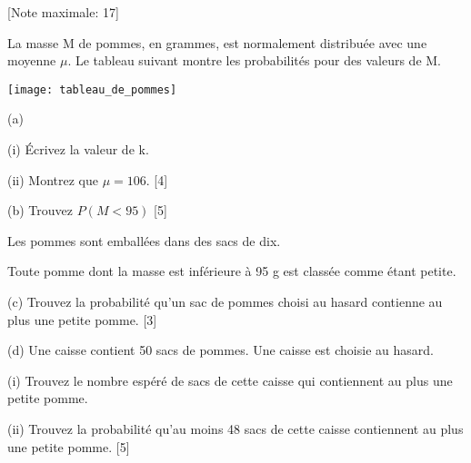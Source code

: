 \begin{question}
  \hspace*{\fill} [Note maximale: 17]\par
  \noindent La masse M de pommes, en grammes, est normalement distribuée avec une moyenne $\mu$. Le
  tableau suivant montre les probabilités pour des valeurs de M.\par
  \medskip
  \texttt{[image: tableau\_de\_pommes]}\par
  \medskip
  (a)\par
  \medskip
  \hspace{1em}(i)  Écrivez la valeur de k.\par
  \medskip
  \hspace{1em}(ii) Montrez que $\mu = 106$.\hspace*{\fill} [4]\par
  \medskip
  (b) Trouvez $ P(M < 95)$\hspace*{\fill} [5]\par
  \medskip
  \noindent Les pommes sont emballées dans des sacs de dix.\par
  \noindent Toute pomme dont la masse est inférieure à 95 g est classée comme étant petite.\par
  \medskip
  (c) Trouvez la probabilité qu’un sac de pommes choisi au hasard contienne au plus une petite pomme.\hspace*{\fill} [3]\par
  \medskip
  (d) Une caisse contient 50 sacs de pommes. Une caisse est choisie au hasard.\par
  \medskip
  \hspace{1em}(i)  Trouvez le nombre espéré de sacs de cette caisse qui contiennent au plus une petite
pomme.\par  
  \medskip
  \hspace{1em}(ii) Trouvez la probabilité qu’au moins 48 sacs de cette caisse contiennent au plus une petite
pomme.\hspace*{\fill} [5]\par
  \bigskip

\end{question}

